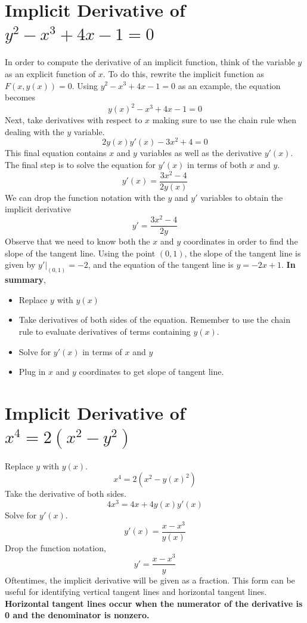 \documentclass[12pt, letterpaper]{article}
\begin{document}
\section{Implicit Derivative of $y^2-x^3+4x-1 = 0$}
In order to compute the derivative of an implicit function, think of the variable $y$ as an explicit function of $x$. To do this, rewrite the implicit function as $F(x,y(x)) = 0$. Using $y^2-x^3+4x-1 = 0$ as an example, the equation becomes \[y(x)^2-x^3+4x-1=0\] Next, take derivatives with respect to $x$ making sure to use the chain rule when dealing with the $y$ variable. \[2y(x)y'(x)-3x^2+4 = 0\] This final equation contains $x$ and $y$ variables as well as the derivative $y'(x)$. The final step is to solve the equation for $y'(x)$ in terms of both $x$ and $y$. \[y'(x) = \frac{3x^2-4}{2y(x)}\] We can drop the function notation with the $y$ and $y'$ variables to obtain the implicit derivative \[y' = \frac{3x^2-4}{2y}\] Observe that we need to know both the $x$ and $y$ coordinates in order to find the slope of the tangent line. Using the point $(0,1)$, the slope of the tangent line is given by $y'|_{(0,1)} = -2$, and the equation of the tangent line is $y = -2x+1$. \textbf{In summary},
\begin{itemize}
	\item Replace $y$ with $y(x)$
	\item Take derivatives of both sides of the equation. Remember to use the chain rule to evaluate derivatives of terms containing $y(x)$.
	\item Solve for $y'(x)$ in terms of $x$ and $y$
	\item Plug in $x$ and $y$ coordinates to get slope of tangent line.
\end{itemize}

\section{Implicit Derivative of $x^4 = 2(x^2-y^2)$}
Replace $y$ with $y(x)$. \[x^4 = 2(x^2-y(x)^2)\] Take the derivative of both sides. \[4x^3 = 4x+4y(x)y'(x)\] Solve for $y'(x)$. \[y'(x) = \frac{x-x^3}{y(x)}\] Drop the function notation, \[y' = \frac{x-x^3}{y}\] Oftentimes, the implicit derivative will be given as a fraction. This form can be useful for identifying vertical tangent lines and horizontal tangent lines. \textbf{Horizontal tangent lines occur when the numerator of the derivative is 0 and the denominator is nonzero.}
\end{document}
